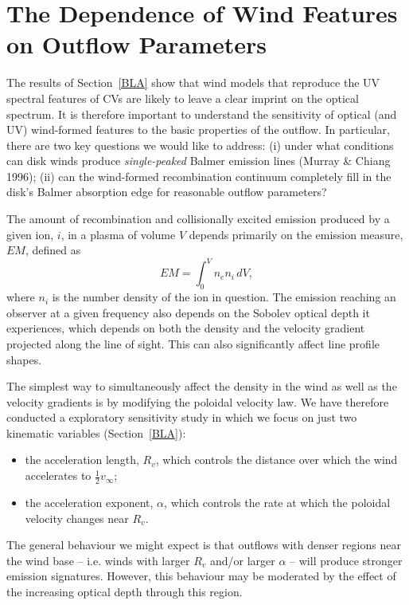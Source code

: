 \documentclass[preprint, a4paper, 11pt]{aastex}
\begin{document}
%
%

\section{The Dependence of Wind Features on Outflow Parameters}

The results of Section~\ref{BLA} show that wind models that reproduce
the UV spectral features of CVs are likely to leave a clear imprint on
the optical spectrum. It is therefore important to understand the
sensitivity of optical (and UV) wind-formed features to the basic
properties of the outflow. In particular, there are two key questions
we would like to address: (i) under what conditions can disk winds
produce {\em single-peaked} Balmer emission lines (Murray \& Chiang
1996); (ii) can the wind-formed recombination continuum completely
fill in the disk's Balmer absorption edge for reasonable outflow
parameters? 

The amount of recombination and collisionally excited emission
produced by a given ion, $i$, in a plasma of volume $V$ depends
primarily on the emission measure, $EM$, defined as 
\begin{equation}
EM=\int^V_0 n_e n_i \,dV,
\end{equation}
where $n_i$ is the number density of the ion in question.    
The emission reaching an observer at a given frequency also depends on
the Sobolev optical depth it experiences, which depends on both the
density and the velocity gradient projected along the line of
sight. This can also significantly affect line profile shapes. 

The simplest way to simultaneously affect the density in the wind as
well as the velocity gradients is by modifying the poloidal velocity
law. We have therefore conducted a exploratory sensitivity study in
which we focus on just two kinematic variables (Section~\ref{BLA}):
\begin{itemize}
 	\item the acceleration length, $R_v$, which controls the
        distance over which the wind accelerates to $\frac{1}{2}v_{\infty}$;
 	\item the acceleration exponent, $\alpha$, which controls the rate 
 	at which the poloidal velocity changes near $R_v$.
\end{itemize} 
The general behaviour we might expect is that outflows with denser
regions near the wind base -- i.e. winds with larger $R_{v}$ and/or
larger $\alpha$ -- will produce stronger emission signatures. However,
this behaviour may be moderated by the effect of the increasing
optical depth through this region.
\end{document}
